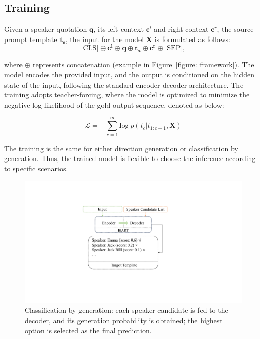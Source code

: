\documentclass[letterpaper]{article} %
\begin{document}
\subsection{Training}

Given a speaker quotation $\mathbf{q}$, its left context $\mathbf{c}^{l}$ and right context $\mathbf{c}^{r}$, the source prompt template $\mathbf{t_s}$, the input for the model $\mathbf{X}$ is formulated as follows:
\begin{equation}
        \text{[CLS]} \oplus \mathbf{c^l} \oplus \mathbf{q} \oplus \mathbf{t_{s}} \oplus \mathbf{c^r} \oplus \text{[SEP]}, %
\end{equation}

where $\oplus$ represents concatenation (example in Figure~\ref{figure: framework}).
The model encodes the provided input, and the output is conditioned on the hidden state of the input, following the standard encoder-decoder architecture.
The training adopts teacher-forcing, where the model is optimized to minimize the negative log-likelihood of the gold output sequence, denoted as below:

\begin{equation}
    \mathcal{L} = - \sum_{c=1}^{m} \mathrm{log}\; p(t_{c}|t_{1:c-1},\mathbf{X})
\end{equation}

The training is the same for either direction generation or classification by generation. Thus, the trained model is flexible to choose the inference according to specific scenarios.

\begin{figure}[th]
\centering
\includegraphics[width=0.65\columnwidth]{cls.pdf}
\caption{Classification by generation: each speaker candidate is fed to the decoder, and its generation probability is obtained; the highest option is selected as the final prediction.}
\label{figure: score}
\end{figure}
\end{document}
